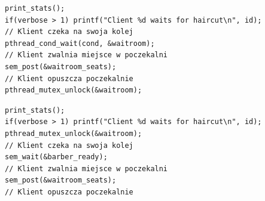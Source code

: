 \documentclass[12pt,a4paper]{article}
\begin{document}
	\begin{center}
		\begin{minipage}{0.8\linewidth}
\begin{lstlisting}[caption = Klient ze zmiennymi warunkowymi.]
print_stats();
if(verbose > 1) printf("Client %d waits for haircut\n", id);
// Klient czeka na swoja kolej
pthread_cond_wait(cond, &waitroom);
// Klient zwalnia miejsce w poczekalni
sem_post(&waitroom_seats);
// Klient opuszcza poczekalnie
pthread_mutex_unlock(&waitroom);
\end{lstlisting}
		\end{minipage}
	\end{center}


	\begin{center}
		\begin{minipage}{0.8\linewidth}
\begin{lstlisting}[caption = Klient bez zmiennych warunkowych.]
print_stats();
if(verbose > 1) printf("Client %d waits for haircut\n", id);
pthread_mutex_unlock(&waitroom);
// Klient czeka na swoja kolej
sem_wait(&barber_ready);
// Klient zwalnia miejsce w poczekalni
sem_post(&waitroom_seats);
// Klient opuszcza poczekalnie
\end{lstlisting}
		\end{minipage}
	\end{center}

	
\end{document}
